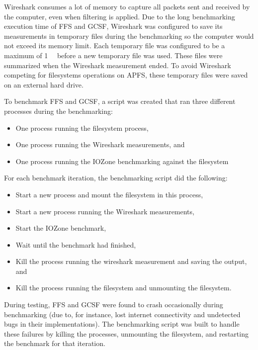 Wireshark consumes a lot of memory to capture all packets sent and received by the computer, even when filtering is applied. Due to the long benchmarking execution time of \gls{FFS} and \gls{GCSF}, Wireshark was configured to save its measurements in temporary files during the benchmarking so the computer would not exceed its memory limit. Each temporary file was configured to be a maximum of \SI{1}{\giga\byte} before a new temporary file was used. These files were summarized when the Wireshark measurement ended. To avoid Wireshark competing for filesystems operations on \gls{APFS}, these temporary files were saved on an external hard drive.

To benchmark \gls{FFS} and \gls{GCSF}, a script was created that ran three different processes during the benchmarking:
\begin{itemize}
	\item One process running the filesystem process,
	\item One process running the Wireshark measurements, and
	\item One process running the IOZone benchmarking against the filesystem
\end{itemize}

For each benchmark iteration, the benchmarking script did the following:
\begin{itemize}
	\item Start a new process and mount the filesystem in this process,
	\item Start a new process running the Wireshark measurements,
	\item Start the IOZone benchmark,
	\item Wait until the benchmark had finished,
	\item Kill the process running the wireshark measurement and saving the output, and
	\item Kill the process running the filesystem and unmounting the filesystem.
\end{itemize}

During testing, \gls{FFS} and \gls{GCSF} were found to crash occasionally during benchmarking (due to, for instance, lost internet connectivity and undetected bugs in their implementations). The benchmarking script was built to handle these failures by killing the processes, unmounting the filesystem, and restarting the benchmark for that iteration. 

